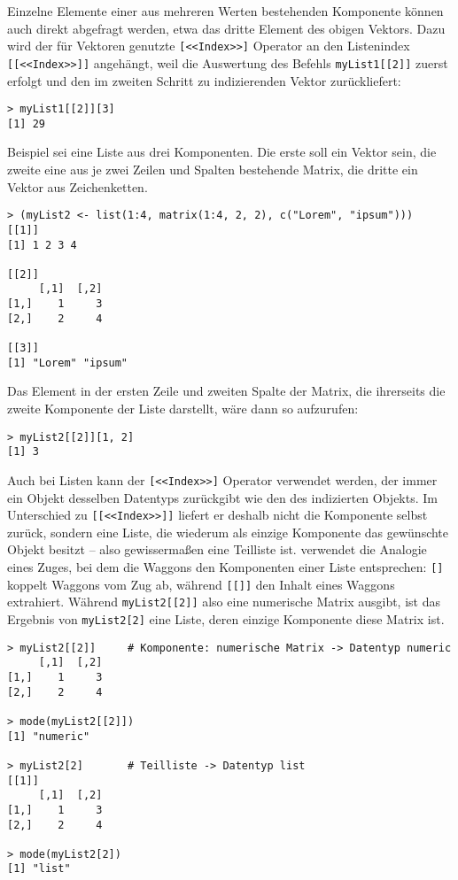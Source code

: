 Einzelne Elemente einer aus mehreren Werten bestehenden Komponente können auch direkt abgefragt werden, etwa das dritte Element des obigen Vektors. Dazu wird der für Vektoren genutzte \lstinline![<<Index>>]! Operator an den Listenindex \lstinline![[<<Index>>]]! angehängt, weil die Auswertung des Befehls \lstinline!myList1[[2]]! zuerst erfolgt und den im zweiten Schritt zu indizierenden Vektor zurückliefert:
\begin{lstlisting}
> myList1[[2]][3]
[1] 29
\end{lstlisting}

Beispiel sei eine Liste aus drei Komponenten. Die erste soll ein Vektor sein, die zweite eine aus je zwei Zeilen und Spalten bestehende Matrix, die dritte ein Vektor aus Zeichenketten.
\begin{lstlisting}
> (myList2 <- list(1:4, matrix(1:4, 2, 2), c("Lorem", "ipsum")))
[[1]]
[1] 1 2 3 4

[[2]]
     [,1]  [,2]
[1,]    1     3
[2,]    2     4

[[3]]
[1] "Lorem" "ipsum"
\end{lstlisting}

Das Element in der ersten Zeile und zweiten Spalte der Matrix, die ihrerseits die zweite Komponente der Liste darstellt, wäre dann so aufzurufen:
\begin{lstlisting}
> myList2[[2]][1, 2]
[1] 3
\end{lstlisting}

Auch bei Listen kann der \lstinline![<<Index>>]! Operator verwendet werden, der immer ein Objekt desselben Datentyps zurückgibt wie den des indizierten Objekts. Im Unterschied zu \lstinline![[<<Index>>]]! liefert er deshalb nicht die Komponente selbst zurück, sondern eine Liste, die wiederum als einzige Komponente das gewünschte Objekt besitzt -- also gewissermaßen eine Teilliste ist.  verwendet die Analogie eines Zuges, bei dem die Waggons den Komponenten einer Liste entsprechen: \lstinline![]! koppelt Waggons vom Zug ab, während \lstinline![[]]! den Inhalt eines Waggons extrahiert. Während \lstinline!myList2[[2]]! also eine numerische Matrix ausgibt, ist das Ergebnis von \lstinline!myList2[2]! eine Liste, deren einzige Komponente diese Matrix ist.
\begin{lstlisting}
> myList2[[2]]     # Komponente: numerische Matrix -> Datentyp numeric
     [,1]  [,2]
[1,]    1     3
[2,]    2     4

> mode(myList2[[2]])
[1] "numeric"

> myList2[2]       # Teilliste -> Datentyp list
[[1]]
     [,1]  [,2]
[1,]    1     3
[2,]    2     4

> mode(myList2[2])
[1] "list"
\end{lstlisting}

